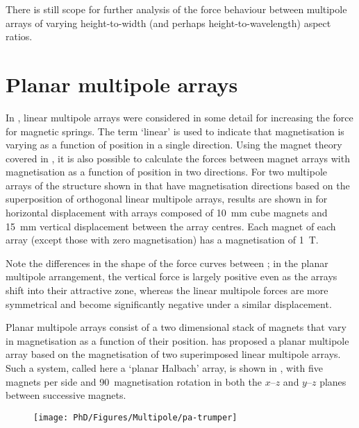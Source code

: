 \documentclass[11pt,a4paper]{memoir}
\begin{document}
There is still scope for further analysis of the force behaviour between multipole arrays of varying height-to-width (and perhaps height-to-wavelength) aspect ratios.


\section{Planar multipole arrays}

In , linear multipole arrays were considered in some detail for increasing the force for magnetic springs.
The term `linear' is used to indicate that magnetisation is varying as a function of position in a single direction.
Using the magnet theory covered in , it is also possible to calculate the forces between magnet arrays with magnetisation as a function of position in two directions.
For two multipole arrays of the structure shown in  that have magnetisation directions based on the superposition of orthogonal linear multipole arrays, results are shown in  for horizontal displacement with arrays composed of \SI{10}{mm} cube magnets and \SI{15}{mm} vertical displacement between the array centres.
Each magnet of each array (except those with zero magnetisation) has a magnetisation of \SI{1}{T}.

Note the differences in the shape of the force curves between ; in the planar multipole arrangement, the vertical force is largely positive even as the arrays shift into their attractive zone, whereas the linear multipole forces are more symmetrical and become significantly negative under a similar displacement.

Planar multipole arrays consist of a two dimensional stack of magnets that vary in magnetisation as a function of their position.
\textcite[Appendix~A]{kim1997-thesis} has proposed a planar multipole array based on the magnetisation of two superimposed linear multipole arrays.
Such a system, called here a `planar Halbach' array, is shown in , with five magnets per side and 90\textdegree\ magnetisation rotation in both the $x$--$z$ and $y$--$z$ planes between successive magnets.

\begin{figure}
\centering
\texttt{[image: PhD/Figures/Multipole/pa-trumper]}
\end{figure}
\end{document}
